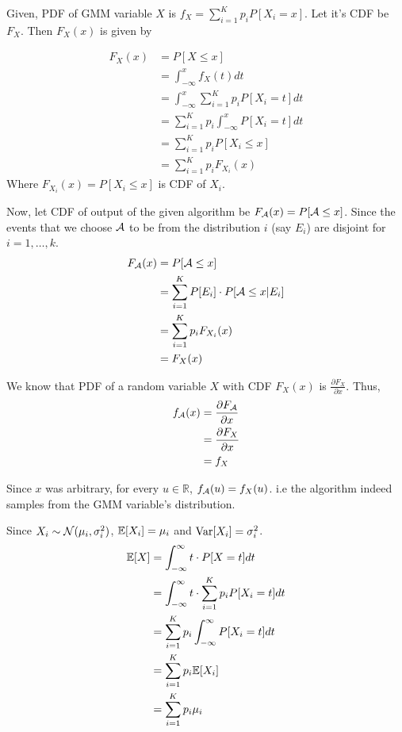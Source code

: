 \begin{solution}


	Given, PDF of GMM variable $X$ is $f_X = \sum_{i=1}^K p_iP[X_i=x]$. Let
	it's CDF be $F_X$. Then $F_X(x)$ is given by

	\begin{align}
		F_X(x) & = P[X\leq x]                                    \\
		       & = \int_{-\infty}^{x} f_X(t)dt                   \\
		       & = \int_{-\infty}^{x} \sum_{i=1}^K p_iP[X_i=t]dt \\
		       & = \sum_{i=1}^K p_i\int_{-\infty}^{x} P[X_i=t]dt \\
		       & = \sum_{i=1}^K p_iP[X_i\leq x]                  \\
		       & = \sum_{i=1}^K p_iF_{X_i}(x)
	\end{align}
	Where $F_{X_i}(x) = P[X_i\leq x]$ is CDF of $X_i$.

	Now, let CDF of output of the given algorithm be
	$F_{\mathcal{A}}(x) = P[\mathcal{A}\leq x]$. Since the events that we choose $\mathcal{A}$ to be
	from the distribution $i$ (say $E_i$) are disjoint for $i=1,\dots,k$.
	\begin{align}
		F_{\mathcal{A}}(x) & = P[\mathcal{A}\leq x]                                \\
		        & = \sum_{i=1}^K P[E_i]\cdot P[\mathcal{A}\leq x | E_i] \\
		        & = \sum_{i=1}^K p_iF_{X_i}(x)                 \\
		        & = F_X(x)
	\end{align}

	We know that PDF of a random variable $X$ with CDF $F_X(x)$ is
	$\frac{\partial F_X}{\partial x}$. Thus,
	\begin{align}
		f_{\mathcal{A}}(x) & = \frac{\partial F_{\mathcal{A}}}{\partial x} \\
		        & = \frac{\partial F_X}{\partial x}  \\
		        & = f_X
	\end{align}

	Since $x$ was arbitrary, for every $u\in\mathbb{R}$, $f_{\mathcal{A}}(u) =
		f_X(u)$. i.e the algorithm indeed samples from the GMM variable's
	distribution.



	Since $X_i\sim\mathcal{N}(\mu_i,\sigma_i^2)$, $\mathbb{E}[X_i] = \mu_i$ and $\text{Var}[X_i] = \sigma_i^2$.
	\begin{align}
		\mathbb{E}[X] & = \int_{-\infty}^{\infty} t\cdot P[X=t]dt                    \\
		      & = \int_{-\infty}^{\infty} t\cdot \sum_{i=1}^K p_iP[X_i=t] dt \\
		      & = \sum_{i=1}^K p_i \int_{-\infty}^{\infty} P[X_i = t] dt     \\
		      & = \sum_{i=1}^K p_i \mathbb{E}[X_i]                                   \\
		      & = \sum_{i=1}^K p_i\mu_i
	\end{align}


\end{solution}
